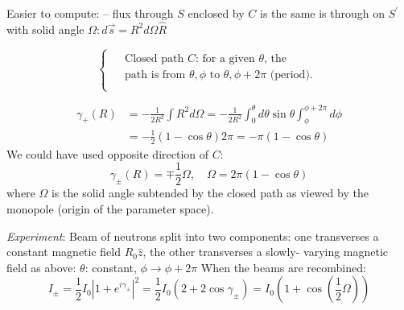 \documentclass[12pt]{article}
\newcommand{\be}{\begin{equation}}
\newcommand{\ee}{\end{equation}}
\begin{document}
\begin{minipage}{0.4\textwidth}
Easier to compute:
-- flux through $S$
enclosed by $C$ is the
same is through on $S^{\prime}$
with solid angle $\Omega: d \vec{s}=R^{2} d \Omega \hat{R}$
\end{minipage}%
\hfill
\begin{minipage}{0.6\textwidth}
\[
\begin{cases}
\begin{aligned}
&\text{Closed path $C$: for a given $\theta$, the}\\
&\text{path is from $\theta, \phi$ to $\theta, \phi+2 \pi$ (period).}\\
\end{aligned}
\end{cases}
\]
\vspace{1em}
\end{minipage}

\be
\begin{aligned}
\gamma_{+}(R)
&=-\frac{1}{2 R^{2}} \int R^{2} d \Omega=-\frac{1}{2 R^{2}} \int_{0}^{\theta} d \theta \sin \theta \int_{\phi}^{\phi+2 \pi} d \phi\\
&=-\frac{1}{2}(1-\cos \theta) 2 \pi=-\pi(1-\cos \theta)
\end{aligned}
\ee
We could have used opposite direction of $C$:
\[
\gamma_{\pm}(R)=\mp \frac{1}{2} \Omega, \quad \Omega=2 \pi(1-\cos \theta)
\]
where $\Omega$ is the
solid angle subtended by the
closed path as viewed by
the monopole (origin of the
parameter space).

\emph{Experiment}: Beam of neutrons
split into two
components: 
one transverses a constant
magnetic field $R_{0} \hat{z}$,
the other transverses a slowly-%
varying magnetic field as above:
$\theta$: constant, $\phi \rightarrow \phi+2 \pi$
When the beams are recombined:
\be
I_{\pm} 
=\frac{1}{2} I_{0}\left|1+e^{i \gamma_{\pm}}\right|^{2}=\frac{1}{2} I_{0}\left(2+2 \cos \gamma_{\pm}\right)
=I_{0}\left(1+\cos \left(\frac{1}{2}\Omega\right)\right) 
\ee

\end{document}
